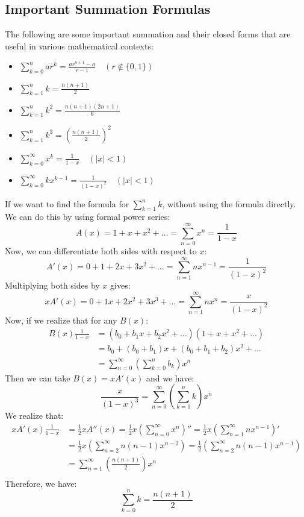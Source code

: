 \subsection{Important Summation Formulas}
The following are some important summation and their closed forms that are useful in various mathematical contexts:
\begin{itemize}[itemsep=1pt,label=$\circ$]
    \item $\sum_{k = 0}^{n} ar^k = \frac{ar^{n + 1} - a}{r - 1} \quad (r \notin \{0, 1\})$
    \item $\sum_{k = 1}^{n} k = \frac{n(n + 1)}{2}$
    \item $\sum_{k = 1}^{n} k^2 = \frac{n (n + 1)(2n + 1)}{6}$
    \item $\sum_{k = 1}^{n} k^3 = \left(\frac{n(n + 1)}{2}\right)^2$
    \item $\sum_{k = 0}^{\infty} x^k = \frac{1}{1 - x} \quad (|x| < 1)$
    \item $\sum_{k = 0}^{\infty} kx^{k - 1} = \frac{1}{(1 - x)^2} \quad (|x| < 1)$
\end{itemize}
\begin{eg}
    If we want to find the formula for $\sum_{k = 1}^{n} k$, without using the formula directly. We can do this by using formal power series:
    \[
        A(x) = 1 + x + x^2 + \ldots = \sum_{n = 0}^{\infty} x^n = \frac{1}{1 -x}
    \]
    Now, we can differentiate both sides with respect to $x$:
    \[
        A'(x) = 0 + 1 + 2x + 3x^2 + \ldots = \sum_{n = 1}^{\infty} nx^{n - 1} = \frac{1}{(1 - x)^2}
    \]
    Multiplying both sides by $x$ gives:
    \[
        xA'(x) = 0 + 1x + 2x^2 + 3x^3 + \ldots = \sum_{n = 1}^{\infty} nx^n = \frac{x}{(1 - x)^2}
    \]
    Now, if we realize that for any $B(x)$:
    \begin{align*}
        B(x) \frac{1}{1 - x} &= (b_0 + b_1x + b_2 x^2 + \ldots)(1 + x + x^2 + \ldots) \\
        &= b_0 + (b_0 + b_1)x + (b_0 + b_1 + b_2)x^2 + \ldots \\
        &= \sum_{n = 0}^{\infty} \left(\sum_{k = 0}^{n} b_k\right)x^n
    \end{align*}
    Then we can take $B(x) = xA'(x)$ and we have:
    \[
        \frac{x}{(1 - x)^3} = \sum_{n = 0}^{\infty} \left(\sum_{k = 1}^{n} k\right)x^n
    \]
    We realize that:
    \begin{align*}
        xA'(x) \frac{1}{1 - x} &= \frac{1}{2}x A''(x) = \frac{1}{2}x \left( \sum_{n = 0}^{\infty} x^n\right)'' = \frac{1}{2}x \left( \sum_{n = 1}^{\infty} nx^{n-1} \right)' \\
        &= \frac{1}{2}x \left( \sum_{n = 2}^{\infty} n (n - 1) x^{n - 2} \right) = \frac{1}{2} \left( \sum_{n = 2}^{\infty} n (n - 1) x^{n - 1} \right) \\
        &= \sum_{n = 1}^{\infty} \left(\frac{n(n + 1)}{2}\right)x^n \\
    \end{align*}
    Therefore, we have:
    \[
        \sum_{k = 0}^{n} k = \frac{n(n + 1)}{2}
    \]
\end{eg}
